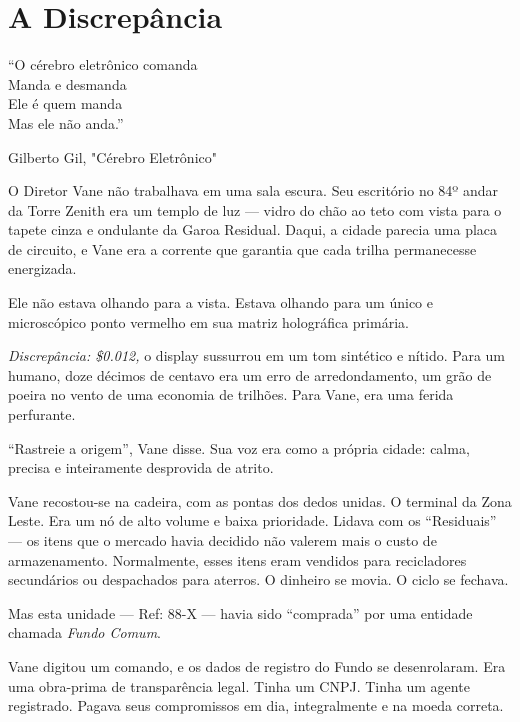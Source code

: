 
\chapter{A Discrepância}
\epigraph{``O cérebro eletrônico comanda \\ Manda e desmanda \\ Ele é quem manda \\ Mas ele não anda.''}{Gilberto Gil, "Cérebro Eletrônico"}

O Diretor Vane não trabalhava em uma sala escura. Seu escritório no 84º andar da Torre Zenith era um templo de luz --- vidro do chão ao teto com vista para o tapete cinza e ondulante da Garoa Residual. Daqui, a cidade parecia uma placa de circuito, e Vane era a corrente que garantia que cada trilha permanecesse energizada.

Ele não estava olhando para a vista. Estava olhando para um único e microscópico ponto vermelho em sua matriz holográfica primária.

\textit{Discrepância: \$0.012,} o display sussurrou em um tom sintético e nítido. Para um humano, doze décimos de centavo era um erro de arredondamento, um grão de poeira no vento de uma economia de trilhões. Para Vane, era uma ferida perfurante.

``Rastreie a origem'', Vane disse. Sua voz era como a própria cidade: calma, precisa e inteiramente desprovida de atrito.


Vane recostou-se na cadeira, com as pontas dos dedos unidas. O terminal da Zona Leste. Era um nó de alto volume e baixa prioridade. Lidava com os ``Residuais'' --- os itens que o mercado havia decidido não valerem mais o custo de armazenamento. Normalmente, esses itens eram vendidos para recicladores secundários ou despachados para aterros. O dinheiro se movia. O ciclo se fechava.

Mas esta unidade --- Ref: 88-X --- havia sido ``comprada'' por uma entidade chamada \textit{Fundo Comum}.

Vane digitou um comando, e os dados de registro do Fundo se desenrolaram. Era uma obra-prima de transparência legal. Tinha um CNPJ. Tinha um agente registrado. Pagava seus compromissos em dia, integralmente e na moeda correta.

